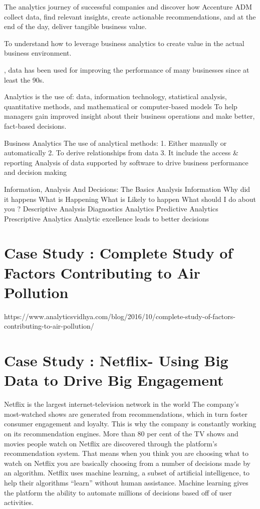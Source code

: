 The analytics journey of successful companies and discover how Accenture ADM collect data, find relevant insights, create actionable recommendations, and at the end of the day, deliver tangible business value.
 
To understand how to leverage business analytics to create value in the actual business environment.

, data has been used for improving the performance of many businesses since at least the 90s.

Analytics is the use of: data, information technology, statistical analysis, quantitative methods, and mathematical or computer-based models To help managers gain improved insight about their business operations and make better, fact-based decisions.

 Business Analytics The use of analytical methods: 1. Either manually or automatically 2. To derive relationships from data 3. It include the access \& reporting Analysis of data supported by software to drive business performance and decision making

 Information, Analysis And Decisions: The Basics Analysis Information Why did it happens What is Happening What is Likely to happen What should I do about you ? Descriptive Analysis Diagnostics Analytics Predictive Analytics Prescriptive Analytics Analytic excellence leads to better decisions


\section{Case Study : Complete Study of Factors Contributing to Air Pollution}

https://www.analyticsvidhya.com/blog/2016/10/complete-study-of-factors-contributing-to-air-pollution/



\section{ Case Study :  Netflix- Using Big Data to Drive Big Engagement}

Netflix is the largest internet-television network in the world
 The company’s most-watched shows are generated from recommendations, which in turn foster consumer engagement and loyalty. This is why the company is constantly working on its recommendation engines.
More than 80 per cent of the TV shows and movies people watch on Netflix are discovered through the platform’s recommendation system. That means when you think you are choosing what to watch on Netflix you are basically choosing from a number of decisions made by an algorithm.
Netflix uses machine learning, a subset of artificial intelligence, to help their algorithms “learn” without human assistance. Machine learning gives the platform the ability to automate millions of decisions based off of user activities. 
